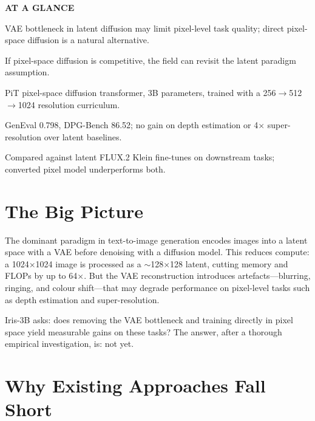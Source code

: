 \documentclass[10pt,twocolumn]{article}
\begin{document}
\begin{mdframed}[backgroundcolor=boxgray,linecolor=rulered,linewidth=1pt,
    innerleftmargin=6pt,innerrightmargin=6pt,
    innertopmargin=6pt,innerbottommargin=6pt]
\textbf{\small AT A GLANCE}\par\vspace{4pt}
\begin{description}[leftmargin=0pt,labelsep=4pt,itemsep=2pt,parsep=0pt,
    font=\small\bfseries]
  \item[Problem:] VAE bottleneck in latent diffusion may limit pixel-level
    task quality; direct pixel-space diffusion is a natural alternative.
  \item[Why it matters:] If pixel-space diffusion is competitive,
    the field can revisit the latent paradigm assumption.
  \item[Method:] PiT pixel-space diffusion transformer, 3B parameters,
    trained with a 256$\to$512$\to$1024 resolution curriculum.
  \item[Result:] GenEval 0.798, DPG-Bench 86.52; no gain on depth
    estimation or 4$\times$ super-resolution over latent baselines.
  \item[Evidence:] Compared against latent FLUX.2 Klein fine-tunes on
    downstream tasks; converted pixel model underperforms both.
\end{description}
\end{mdframed}

\section{The Big Picture}

The dominant paradigm in text-to-image generation encodes images into a
latent space with a VAE before denoising with a diffusion model. This
reduces compute: a 1024$\times$1024 image is processed as a
$\sim$128$\times$128 latent, cutting memory and FLOPs by up to 64$\times$.
But the VAE reconstruction introduces artefacts---blurring, ringing, and
colour shift---that may degrade performance on pixel-level tasks such as
depth estimation and super-resolution.

Iris-3B asks: does removing the VAE bottleneck and training directly in
pixel space yield measurable gains on these tasks? The answer, after a
thorough empirical investigation, is: not yet.

\section{Why Existing Approaches Fall Short}
\end{document}
